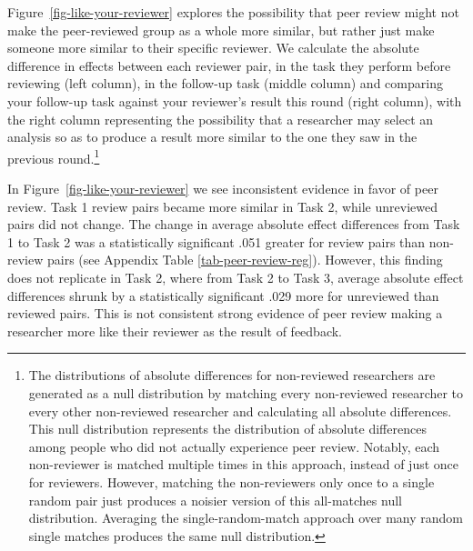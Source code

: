 \documentclass[
  letterpaper,
  DIV=11,
  numbers=noendperiod]{scrartcl}
\begin{document}
Figure~\ref{fig-like-your-reviewer} explores the possibility that peer
review might not make the peer-reviewed group as a whole more similar,
but rather just make someone more similar to their specific reviewer. We
calculate the absolute difference in effects between each reviewer pair,
in the task they perform before reviewing (left column), in the
follow-up task (middle column) and comparing your follow-up task against
your reviewer's result this round (right column), with the right column
representing the possibility that a researcher may select an analysis so
as to produce a result more similar to the one they saw in the previous
round.\footnote{The distributions of absolute differences for
  non-reviewed researchers are generated as a null distribution by
  matching every non-reviewed researcher to every other non-reviewed
  researcher and calculating all absolute differences. This null
  distribution represents the distribution of absolute differences among
  people who did not actually experience peer review. Notably, each
  non-reviewer is matched multiple times in this approach, instead of
  just once for reviewers. However, matching the non-reviewers only once
  to a single random pair just produces a noisier version of this
  all-matches null distribution. Averaging the single-random-match
  approach over many random single matches produces the same null
  distribution.}

In Figure~\ref{fig-like-your-reviewer} we see inconsistent evidence in
favor of peer review. Task 1 review pairs became more similar in Task 2,
while unreviewed pairs did not change. The change in average absolute
effect differences from Task 1 to Task 2 was a statistically significant
.051 greater for review pairs than non-review pairs (see Appendix Table
\ref{tab-peer-review-reg}). However, this finding does not replicate in
Task 2, where from Task 2 to Task 3, average absolute effect differences
shrunk by a statistically significant .029 more for unreviewed than
reviewed pairs. This is not consistent strong evidence of peer review
making a researcher more like their reviewer as the result of feedback.
\end{document}
